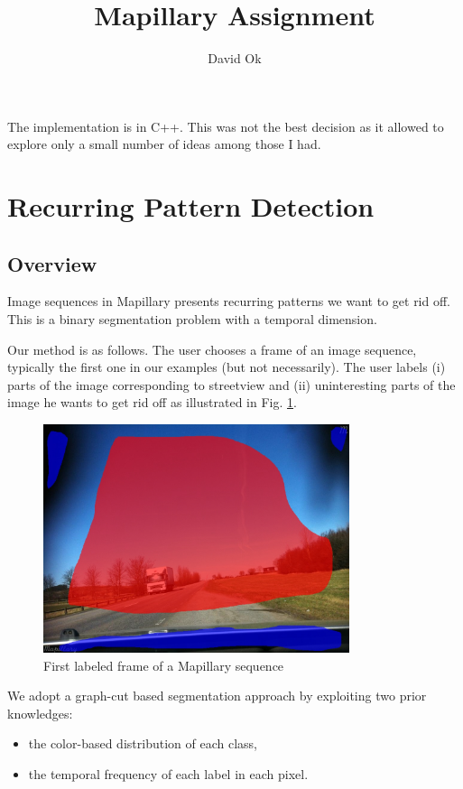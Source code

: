 \documentclass[a4paper,twoside,10pt]{article}
\begin{document}
\title{Mapillary Assignment}
\author{David Ok}
\maketitle

The implementation is in C++. This was not the best decision as it allowed to explore only a small number of ideas among those I had.

\section{Recurring Pattern Detection}

\subsection{Overview}
Image sequences in Mapillary presents recurring patterns we want to get rid off. This is a binary segmentation problem with a temporal dimension.

Our method is as follows. The user chooses a frame of an image sequence, typically the first one in our examples (but not necessarily). The user labels (i) parts of the image corresponding to streetview and (ii) uninteresting parts of the image he wants to get rid off as illustrated in Fig. \ref{fig:labeled_frame}.


\begin{figure}
	\centering
  \includegraphics[width=0.8\textwidth]{labeled_frame.jpg}
	\caption{First labeled frame of a Mapillary sequence}
	\label{fig:labeled_frame}
\end{figure}

We adopt a graph-cut based segmentation approach by exploiting two prior knowledges:
\begin{itemize}
\item the color-based distribution of each class,
\item the temporal frequency of each label in each pixel.
\end{itemize}
\end{document}
